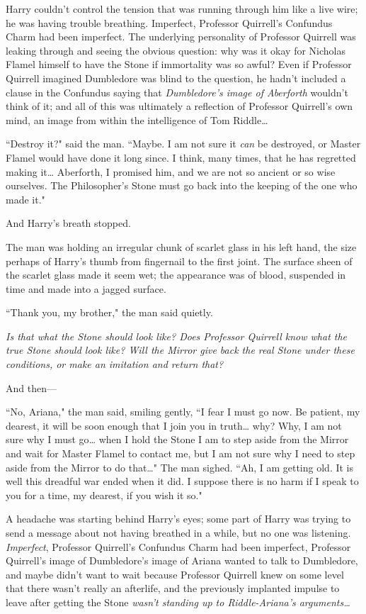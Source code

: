 Harry couldn't control the tension that was running through him like a live wire; he was having trouble breathing. Imperfect, Professor Quirrell's Confundus Charm had been imperfect. The underlying personality of Professor Quirrell was leaking through and seeing the obvious question: why was it okay for Nicholas Flamel himself to have the Stone if immortality was so awful? Even if Professor Quirrell imagined Dumbledore was blind to the question, he hadn't included a clause in the Confundus saying that \emph{Dumbledore's image of Aberforth} wouldn't think of it; and all of this was ultimately a reflection of Professor Quirrell's own mind, an image from within the intelligence of Tom Riddle{\ldots}

``Destroy it?" said the man. ``Maybe. I am not sure it \emph{can} be destroyed, or Master Flamel would have done it long since. I think, many times, that he has regretted making it{\ldots} Aberforth, I promised him, and we are not so ancient or so wise ourselves. The Philosopher's Stone must go back into the keeping of the one who made it."

And Harry's breath stopped.

The man was holding an irregular chunk of scarlet glass in his left hand, the size perhaps of Harry's thumb from fingernail to the first joint. The surface sheen of the scarlet glass made it seem wet; the appearance was of blood, suspended in time and made into a jagged surface.

``Thank you, my brother," the man said quietly.

\emph{Is that what the Stone should look like? Does Professor Quirrell know what the true Stone should look like? Will the Mirror give back the real Stone under these conditions, or make an imitation and return that?}

And then---

``No, Ariana," the man said, smiling gently, ``I fear I must go now. Be patient, my dearest, it will be soon enough that I join you in truth{\ldots} why? Why, I am not sure why I must go{\ldots} when I hold the Stone I am to step aside from the Mirror and wait for Master Flamel to contact me, but I am not sure why I need to step aside from the Mirror to do that{\ldots}" The man sighed. ``Ah, I am getting old. It is well this dreadful war ended when it did. I suppose there is no harm if I speak to you for a time, my dearest, if you wish it so."

A headache was starting behind Harry's eyes; some part of Harry was trying to send a message about not having breathed in a while, but no one was listening. \emph{Imperfect}, Professor Quirrell's Confundus Charm had been imperfect, Professor Quirrell's image of Dumbledore's image of Ariana wanted to talk to Dumbledore, and maybe didn't want to wait because Professor Quirrell knew on some level that there wasn't really an afterlife, and the previously implanted impulse to leave after getting the Stone \emph{wasn't standing up to Riddle-Ariana's arguments{\ldots}}

